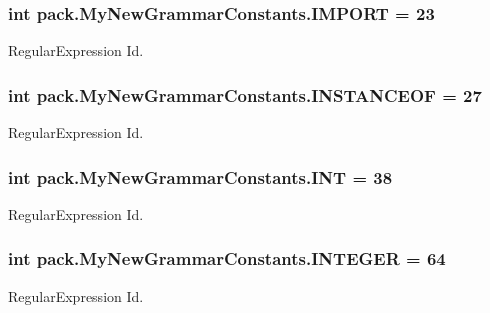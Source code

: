 \subsubsection[{\texorpdfstring{I\+M\+P\+O\+RT}{IMPORT}}]{\setlength{\rightskip}{0pt plus 5cm}int pack.\+My\+New\+Grammar\+Constants.\+I\+M\+P\+O\+RT = 23}\hypertarget{interfacepack_1_1_my_new_grammar_constants_ac9a7d791eddbadd96da71c2039162d28}{}\label{interfacepack_1_1_my_new_grammar_constants_ac9a7d791eddbadd96da71c2039162d28}
Regular\+Expression Id. 
\subsubsection[{\texorpdfstring{I\+N\+S\+T\+A\+N\+C\+E\+OF}{INSTANCEOF}}]{\setlength{\rightskip}{0pt plus 5cm}int pack.\+My\+New\+Grammar\+Constants.\+I\+N\+S\+T\+A\+N\+C\+E\+OF = 27}\hypertarget{interfacepack_1_1_my_new_grammar_constants_aeb5f70a48a8a1824603e541733d149c8}{}\label{interfacepack_1_1_my_new_grammar_constants_aeb5f70a48a8a1824603e541733d149c8}
Regular\+Expression Id. 
\subsubsection[{\texorpdfstring{I\+NT}{INT}}]{\setlength{\rightskip}{0pt plus 5cm}int pack.\+My\+New\+Grammar\+Constants.\+I\+NT = 38}\hypertarget{interfacepack_1_1_my_new_grammar_constants_a3cec69a4aed537ba06930efe848e9417}{}\label{interfacepack_1_1_my_new_grammar_constants_a3cec69a4aed537ba06930efe848e9417}
Regular\+Expression Id. 
\subsubsection[{\texorpdfstring{I\+N\+T\+E\+G\+ER}{INTEGER}}]{\setlength{\rightskip}{0pt plus 5cm}int pack.\+My\+New\+Grammar\+Constants.\+I\+N\+T\+E\+G\+ER = 64}\hypertarget{interfacepack_1_1_my_new_grammar_constants_a35d06a40c39400b6d9505aa2ffb839f8}{}\label{interfacepack_1_1_my_new_grammar_constants_a35d06a40c39400b6d9505aa2ffb839f8}
Regular\+Expression Id. 
